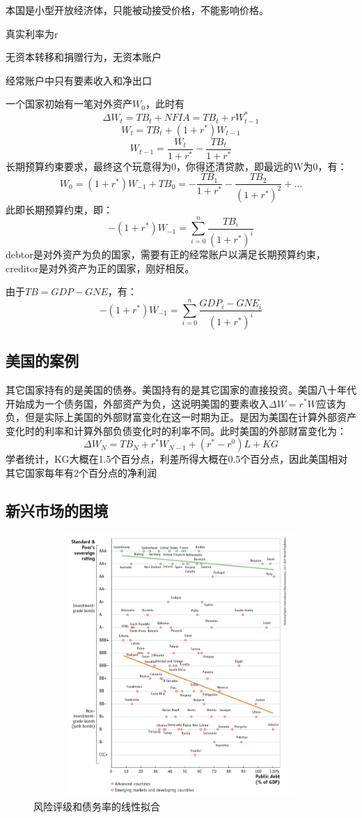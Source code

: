 \documentclass[a4paper, 10pt]{article}
\begin{document}
\noindent 本国是小型开放经济体，只能被动接受价格，不能影响价格。

\noindent 真实利率为r

\noindent 无资本转移和捐赠行为，无资本账户

\noindent 经常账户中只有要素收入和净出口

\noindent 一个国家初始有一笔对外资产$W_0$，此时有
$$\Delta W_t=TB_t+NFIA=TB_t+rW^*_{t-1}$$
$$W_{t}=TB_t+(1+r^*)W_{t-1}$$
$$W_{t-1}=\frac{W_t}{1+r^*}-\frac{TB_t}{1+r^*}$$
长期预算约束要求，最终这个玩意得为0，你得还清贷款，即最远的W为0，有：
$$W_{0}=(1+r^*)W_{-1}+TB_0=-\frac{TB_1}{1+r^*}-\frac{TB_2}{(1+r^*)^2}+\dots$$
此即长期预算约束，即：
$$-(1+r^*)W_{-1}=\sum_{i=0}^n\frac{TB_i}{(1+r^*)^i}$$
debtor是对外资产为负的国家，需要有正的经常账户以满足长期预算约束，creditor是对外资产为正的国家，刚好相反。

\noindent 由于$TB=GDP-GNE$，有：
$$-(1+r^*)W_{-1}=\sum_{i=0}^n\frac{GDP_i-GNE_i}{(1+r^*)^i}$$
\subsection{美国的案例}
\noindent 其它国家持有的是美国的债券。美国持有的是其它国家的直接投资。美国八十年代开始成为一个债务国，外部资产为负，这说明美国的要素收入$\Delta W=r^*W$应该为负，但是实际上美国的外部财富变化在这一时期为正。是因为美国在计算外部资产变化时的利率和计算外部负债变化时的利率不同。此时美国的外部财富变化为：
$$\Delta W_N=TB_N+r^*W_{N-1}+(r^*-r^0)L+KG$$
学者统计，KG大概在1.5个百分点，利差所得大概在0.5个百分点，因此美国相对其它国家每年有2个百分点的净利润


\subsection{新兴市场的困境}
\begin{figure}[h]
  \centering 
  \includegraphics[height=10.0cm,width=12.0cm]{pic1.png}
  
  \caption{风险评级和债务率的线性拟合}
  \label{1}
  
  \end{figure}
  
\end{document}
